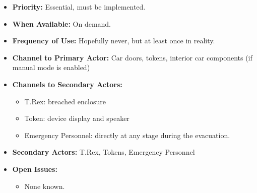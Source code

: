 \documentclass[12pt]{article}
\begin{document}
\begin{itemize}
        \item[]\textbf{Priority:}
            Essential, must be implemented.

        \item[]\textbf{When Available:}
            On demand.

        \item[]\textbf{Frequency of Use:}
            Hopefully never, but at least once in reality.

        \item[]\textbf{Channel to Primary Actor:}
            Car doors, tokens, interior car components (if manual mode is enabled)
            
        \item[]\textbf{Channels to Secondary Actors:}
            \begin{itemize}
                \item[] T.Rex: breached enclosure
                \item[] Token: device display and speaker
                \item[] Emergency Personnel: directly at any stage during the evacuation.
            \end{itemize}
        \item[]\textbf{Secondary Actors:}
            T.Rex, Tokens, Emergency Personnel

        \item[]\textbf{Open Issues:}
            \begin{itemize}
                \item[] None known.
            \end{itemize}
    \end{itemize}
    
    
    
    
\end{document}
